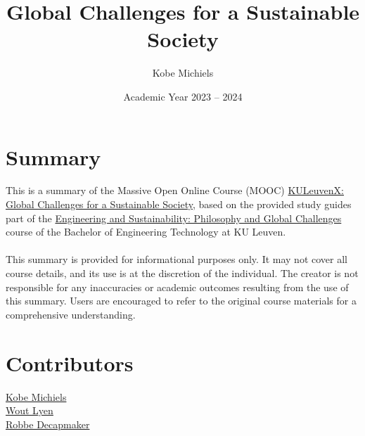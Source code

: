 \documentclass[kul]{kulakarticle} %
\title{Global Challenges for a Sustainable Society}
\author{Kobe Michiels}
\date{Academic Year 2023 -- 2024}
\begin{document}
\maketitle

\section*{Summary}

This is a summary of the Massive Open Online Course (MOOC) \href{https://www.edx.org/learn/science/ku-leuven-global-challenges-for-a-sustainable-society?webview=false&campaign=Global+Challenges+for+a+Sustainable+Society&source=edx&product_category=course&placement_url=https%3A%2F%2Fwww.edx.org%2Fschool%2Fkuleuvenx}{KULeuvenX: Global Challenges for a Sustainable Society}, based on the provided study guides part of the \href{https://onderwijsaanbod.kuleuven.be/syllabi/v/e/T3AID1E.htm#activetab=inhoud_idp1690064}{Engineering and Sustainability: Philosophy and Global Challenges} course of the Bachelor of Engineering Technology at KU Leuven.
\\\\
This summary is provided for informational purposes only. It may not cover all course details, and its use is at the discretion of the individual. The creator is not responsible for any inaccuracies or academic outcomes resulting from the use of this summary. Users are encouraged to refer to the original course materials for a comprehensive understanding.

\section*{Contributors}
\href{https://github.com/michielskobe}{Kobe Michiels}\\
\href{https://github.com/woutlyen}{Wout Lyen}\\
\href{https://github.com/debber1}{Robbe Decapmaker}\\
\newpage

\newpage
\setcounter{tocdepth}{2}
\tableofcontents
\newpage

\newpage

\newpage

\newpage

\newpage

\newpage

\newpage

\newpage

\newpage

\newpage

\newpage

\newpage

\end{document}
